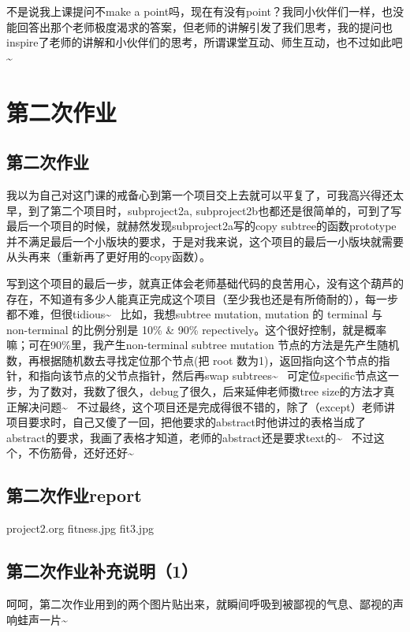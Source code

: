 \documentclass[12pt]{book}
\begin{document}
不是说我上课提问不make a point吗，现在有没有point？我同小伙伴们一样，也没能回答出那个老师极度渴求的答案，但老师的讲解引发了我们思考，我的提问也inspire了老师的讲解和小伙伴们的思考，所谓课堂互动、师生互动，也不过如此吧\textasciitilde{}~

\chapter{第二次作业}
\label{sec-27}
\section{第二次作业}
\label{sec-27-1}
我以为自己对这门课的戒备心到第一个项目交上去就可以平复了，可我高兴得还太早，到了第二个项目时，subproject2a, subproject2b也都还是很简单的，可到了写最后一个项目的时候，就赫然发现subproject2a写的copy subtree的函数prototype并不满足最后一个小版块的要求，于是对我来说，这个项目的最后一小版块就需要从头再来（重新再了更好用的copy函数）。

写到这个项目的最后一步，就真正体会老师基础代码的良苦用心，没有这个葫芦的存在，不知道有多少人能真正完成这个项目（至少我也还是有所倚耐的），每一步都不难，但很tidious\textasciitilde{}~ 比如，我想subtree mutation, mutation 的 terminal 与 non-terminal 的比例分别是 10\% \& 90\% repectively。这个很好控制，就是概率嘛；可在90\%里，我产生non-terminal subtree mutation 节点的方法是先产生随机数，再根据随机数去寻找定位那个节点(把 root 数为1)，返回指向这个节点的指针，和指向该节点的父节点指针，然后再swap subtrees\textasciitilde{}~ 可定位specific节点这一步，为了数对，我数了很久，debug了很久，后来延伸老师擞tree size的方法才真正解决问题\textasciitilde{}~ 不过最终，这个项目还是完成得很不错的，除了（except）老师讲项目要求时，自己又傻了一回，把他要求的abstract时他讲过的表格当成了abstract的要求，我画了表格才知道，老师的abstract还是要求text的\textasciitilde{}~ 不过这个，不伤筋骨，还好还好\textasciitilde{}~

\section{第二次作业report}
\label{sec-27-2}

project2.org
fitness.jpg
fit3.jpg

\section{第二次作业补充说明（1）}
\label{sec-27-3}

呵呵，第二次作业用到的两个图片贴出来，就瞬间呼吸到被鄙视的气息、鄙视的声响蛙声一片\textasciitilde{}~ 
\end{document}
